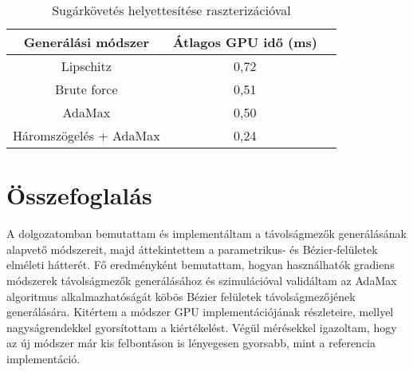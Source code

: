 \begin{table}[H]
	\begin{center}
		\begin{tabular}{| c || c | c |}
			\hline
			\textbf{Generálási módszer} & \textbf{Átlagos GPU idő (ms)} \\ 
			\hline\hline
			Lipschitz & 0,72 \\
			\hline
			Brute force & 0,51 \\
			\hline
			AdaMax & 0,50 \\
			\hline
			Háromszögelés + AdaMax & 0,24 \\
			\hline
		\end{tabular}
	\end{center}
	\caption{Sugárkövetés helyettesítése raszterizációval}
	\label{tab:rast}
\end{table}





\chapter{Összefoglalás}
\label{ch:sum}

A dolgozatomban bemutattam és implementáltam a távolságmezők generálásának alapvető módszereit, majd áttekintettem a parametrikus- és Bézier-felületek elméleti hátterét. Fő eredményként bemutattam, hogyan használhatók gradiens módszerek távolságmezők generálásához és szimulációval validáltam az AdaMax algoritmus alkalmazhatóságát köbös Bézier felületek távolságmezőjének generálására. Kitértem a módszer GPU implementációjának részleteire, mellyel nagyságrendekkel gyorsítottam a kiértékelést. Végül mérésekkel igazoltam, hogy az új módszer már kis felbontáson is lényegesen gyorsabb, mint a referencia implementáció.